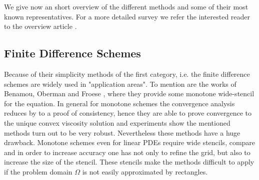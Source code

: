 We give now an short overview of the different methods and some of their most known representatives. For a more detailed survey we refer the interested reader to the overview article \cite[Section 2.1]{FGN2013}.


\subsection{Finite Difference Schemes}

Because of their simplicity methods of the first category, i.e. the finite difference schemes are widely used in "application areas".
To mention are the works of Benamou, Oberman and Froese \cite{BFO2010, Oberman2008, FO2011}, where they provide some monotone wide-stencil for the \MA equation.
In general for monotone schemes the convergence analysis reduces by \cite{BS1991} to a proof of consistency, hence they are able to prove convergence to the unique convex viscosity solution and experiments show the mentioned methods turn out to be very robust.
Nevertheless these methods have a huge drawback. Monotone schemes even for linear PDEs require wide stencils, compare \cite{MW1953}  and in order to increase accuracy one has not only to refine the grid, but also to increase the size of the stencil. These stencils make the methods difficult to apply if the problem domain $\Omega$ is not easily approximated by rectangles.

